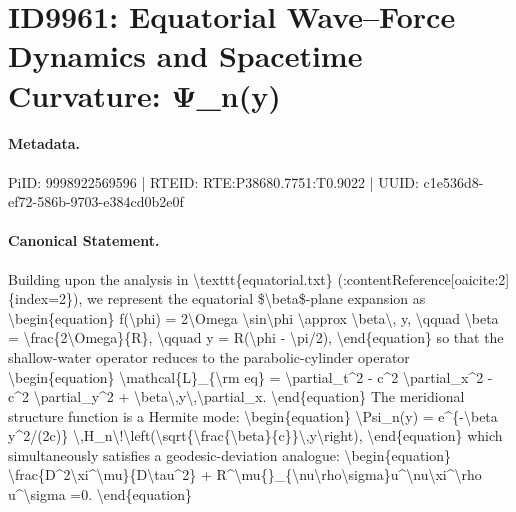 \section*{ID9961: Equatorial Wave–Force Dynamics and Spacetime Curvature: Ψ\_n(y)}
\paragraph{Metadata.}
PiID: 9998922569596 | RTEID: RTE:P38680.7751:T0.9022 | UUID: c1e536d8-ef72-586b-9703-e384cd0b2e0f

\paragraph{Canonical Statement.}
Building upon the analysis in \textbackslash{}texttt\{equatorial.txt\} (:contentReference[oaicite:2]\{index=2\}), we represent the equatorial \$\textbackslash{}beta\$-plane expansion as \textbackslash{}begin\{equation\} f(\textbackslash{}phi) = 2\textbackslash{}Omega \textbackslash{}sin\textbackslash{}phi \textbackslash{}approx \textbackslash{}beta\textbackslash{}, y, \textbackslash{}qquad \textbackslash{}beta = \textbackslash{}frac\{2\textbackslash{}Omega\}\{R\}, \textbackslash{}qquad y = R(\textbackslash{}phi - \textbackslash{}pi/2), \textbackslash{}end\{equation\} so that the shallow-water operator reduces to the parabolic-cylinder operator \textbackslash{}begin\{equation\} \textbackslash{}mathcal\{L\}\_\{\textbackslash{}rm eq\} = \textbackslash{}partial\_t\textasciicircum{}2 - c\textasciicircum{}2 \textbackslash{}partial\_x\textasciicircum{}2 - c\textasciicircum{}2 \textbackslash{}partial\_y\textasciicircum{}2 + \textbackslash{}beta\textbackslash{},y\textbackslash{},\textbackslash{}partial\_x. \textbackslash{}end\{equation\} The meridional structure function is a Hermite mode: \textbackslash{}begin\{equation\} \textbackslash{}Psi\_n(y) = e\textasciicircum{}\{-\textbackslash{}beta y\textasciicircum{}2/(2c)\} \textbackslash{},H\_n\textbackslash{}!\textbackslash{}left(\textbackslash{}sqrt\{\textbackslash{}frac\{\textbackslash{}beta\}\{c\}\}\textbackslash{},y\textbackslash{}right), \textbackslash{}end\{equation\} which simultaneously satisfies a geodesic-deviation analogue: \textbackslash{}begin\{equation\} \textbackslash{}frac\{D\textasciicircum{}2\textbackslash{}xi\textasciicircum{}\textbackslash{}mu\}\{D\textbackslash{}tau\textasciicircum{}2\} + R\textasciicircum{}\textbackslash{}mu\{\}\_\{\textbackslash{}nu\textbackslash{}rho\textbackslash{}sigma\}u\textasciicircum{}\textbackslash{}nu\textbackslash{}xi\textasciicircum{}\textbackslash{}rho u\textasciicircum{}\textbackslash{}sigma =0. \textbackslash{}end\{equation\}


